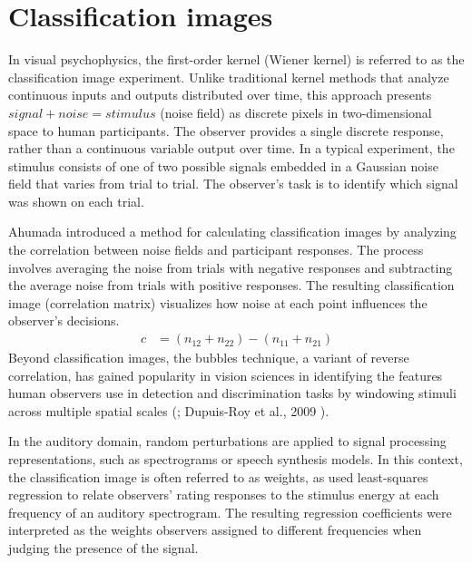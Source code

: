\section {Classification images} 

In visual psychophysics, the first-order kernel (Wiener kernel) is referred to as the classification image experiment. Unlike traditional kernel methods that analyze continuous inputs and outputs distributed over time, this approach presents $signal+noise=stimulus$ (noise field) as discrete pixels in two-dimensional space to human participants. The observer provides a single discrete response, rather than a continuous variable output over time.
In a typical experiment, the stimulus consists of one of two possible signals embedded in a Gaussian noise field that varies from trial to trial. The observer’s task is to identify which signal was shown on each trial.

Ahumada \cite{ahumada_classification_2002} introduced a method for calculating classification images by analyzing the correlation between noise fields and participant responses. The process involves averaging the noise from trials with negative responses and subtracting the average noise from trials with positive responses. The resulting classification image (correlation matrix) visualizes how noise at each point influences the observer's decisions.
\begin{align}
c &= (n_{12} + n_{22}) - (n_{11} + n_{21})
\end{align}
Beyond classification images, the bubbles technique, a variant of reverse correlation, has gained popularity in vision sciences in identifying the features human observers use in detection and discrimination tasks by windowing stimuli across multiple spatial scales (\cite{gosselin_bubbles_2001}\cite{gosselin_superstitious_2003}; Dupuis-Roy et al., 2009 ).

In the auditory domain, random perturbations are applied to signal processing representations, such as spectrograms or speech synthesis models. In this context, the classification image is often referred to as weights, as \cite{ahumada_stimulus_1971} used least-squares regression to relate observers’ rating responses to the stimulus energy at each frequency of an auditory spectrogram. The resulting regression coefficients were interpreted as the weights observers assigned to different frequencies when judging the presence of the signal.

